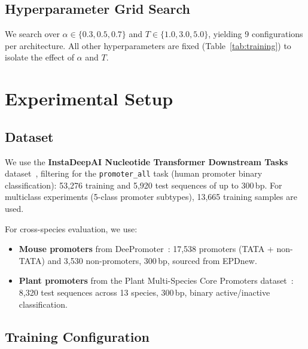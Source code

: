 \documentclass{article}
\begin{document}
\subsection{Hyperparameter Grid Search}

We search over $\alpha \in \{0.3, 0.5, 0.7\}$ and $T \in \{1.0, 3.0, 5.0\}$, yielding 9 configurations per architecture. All other hyperparameters are fixed (Table~\ref{tab:training}) to isolate the effect of $\alpha$ and $T$.

\section{Experimental Setup}
\label{sec:setup}

\subsection{Dataset}

We use the \textbf{InstaDeepAI Nucleotide Transformer Downstream Tasks} dataset~\cite{dallatorre2023nucleotide, instadeep2023dataset}, filtering for the \texttt{promoter\_all} task (human promoter binary classification): 53,276 training and 5,920 test sequences of up to 300\,bp. For multiclass experiments (5-class promoter subtypes), 13,665 training samples are used.

For cross-species evaluation, we use:
\begin{itemize}
    \item \textbf{Mouse promoters} from DeePromoter~\cite{oubounyt2019deepromoter}: 17,538 promoters (TATA + non-TATA) and 3,530 non-promoters, 300\,bp, sourced from EPDnew.
    \item \textbf{Plant promoters} from the Plant Multi-Species Core Promoters dataset~\cite{zhangtaolab2024plant}: 8,320 test sequences across 13 species, 300\,bp, binary active/inactive classification.
\end{itemize}

\subsection{Training Configuration}
\end{document}

